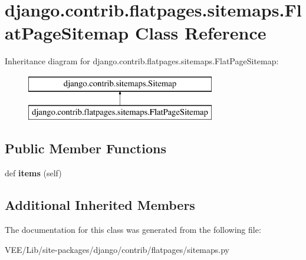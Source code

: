 \hypertarget{classdjango_1_1contrib_1_1flatpages_1_1sitemaps_1_1_flat_page_sitemap}{}\section{django.\+contrib.\+flatpages.\+sitemaps.\+Flat\+Page\+Sitemap Class Reference}
\label{classdjango_1_1contrib_1_1flatpages_1_1sitemaps_1_1_flat_page_sitemap}
Inheritance diagram for django.\+contrib.\+flatpages.\+sitemaps.\+Flat\+Page\+Sitemap\+:\begin{figure}[H]
\begin{center}
\leavevmode
\includegraphics[height=2.000000cm]{classdjango_1_1contrib_1_1flatpages_1_1sitemaps_1_1_flat_page_sitemap}
\end{center}
\end{figure}
\subsection*{Public Member Functions}
\begin{DoxyCompactItemize}
\item 
\mbox{\label{classdjango_1_1contrib_1_1flatpages_1_1sitemaps_1_1_flat_page_sitemap_a6948e64ef6083cce5ad81a02a00e7836}} 
def {\bfseries items} (self)
\end{DoxyCompactItemize}
\subsection*{Additional Inherited Members}


The documentation for this class was generated from the following file\+:\begin{DoxyCompactItemize}
\item 
V\+E\+E/\+Lib/site-\/packages/django/contrib/flatpages/sitemaps.\+py\end{DoxyCompactItemize}
